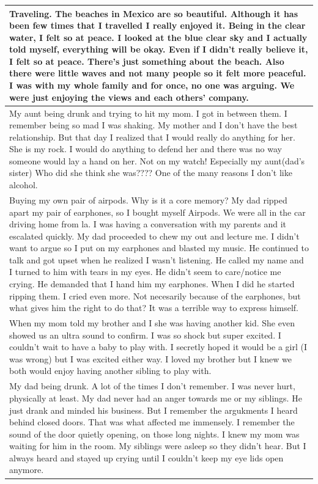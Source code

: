 \documentclass[
  .7em,
  letterpaper,
  DIV=11,
  numbers=noendperiod]{scrartcl}
\begin{document}
\begin{table}
\begin{tabular}{l}
\hline
Traveling. The beaches in Mexico are so beautiful. Although it has been few times that I travelled I really enjoyed it. Being in the clear water, I felt so at peace. I looked at the blue clear sky and I actually told myself, everything will be okay. Even if I didn't really believe it, I felt so at peace. There's just something about the beach. Also there were little waves and not many people so it felt more peaceful. I was with my whole family and for once, no one was arguing. We were just enjoying the views and each others' company.\\
\hline
My aunt being drunk and trying to hit my mom. I got in between them. I remember being so mad I was shaking. My mother and I don't have the best relationship. But that day I realized that I would really do anything for her. She is my rock. I would do anything to defend her and there was no way someone would lay a hand on her. Not on my watch! Especially my aunt(dad's sister) Who did she think she was???? One of the many reasons I don't like alcohol.\\
\hline
Buying my own pair of airpods. Why is it a core memory? My dad ripped apart my pair of earphones, so I bought myself Airpods. We were all in the car driving home from la. I was having a conversation with my parents and it escalated quickly. My dad proceeded to chew my out and lecture me. I didn't want to argue so I put on my earphones and blasted my music. He continued to talk and got upset when he realized I wasn't listening. He called my name and I turned to him with tears in my eyes. He didn't seem to care/notice me crying. He demanded that I hand him my earphones. When I did he started ripping them. I cried even more. Not necesarily because of the earphones, but what gives him the right to do that? It was a terrible way to express himself.\\
\hline
When my mom told my brother and I she was having another kid. She even showed us an ultra sound to confirm. I was so shock but super excited. I couldn't wait to have a baby to play with. I secretly hoped it would be a girl (I was wrong) but I was excited either way. I loved my brother but I knew we both would enjoy having another sibling to play with.\\
\hline
My dad being drunk. A lot of the times I don't remember. I was never hurt, physically at least. My dad never had an anger towards me or my siblings. He just drank and minded his business. But I remember the argukments I heard behind closed doors. That was what affected me immensely. I remember the sound of the door quietly opening, on those long nights. I knew my mom was waiting for him in the room. My siblings were asleep so they didn't hear. But I always heard and stayed up crying until I couldn't keep my eye lids open anymore.\\

\end{tabular}
\end{table}
\end{document}
